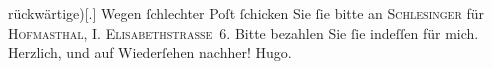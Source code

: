 \begin{ledgroupsized}[t]{13cm}
                  rückwärtige){[}.{]} Wegen ſchlechter Poſt ſchicken Sie ſie bitte an
                  \textsc{Schlesinger} für \textsc{Hofma{\geminationn}sthal}, I. \textsc{Elisabethstrasse 6}.
               Bitte bezahlen Sie ſie indeſſen für mich. Herzlich, und auf Wiederſehen nachher!\pend
           \pstart \spacefill\mbox{Hugo.}\pend{}\endnumbering{}\end{ledgroupsized}  \newcommand{\dateiname}{L01557}\newcommand{\titel}{Hugo von Hofmannsthal an Arthur Schnitzler, 6. 10. 1905}\newcommand{\editorInnen}{Martin Anton Müller und Gerd-Hermann Susen}
            \footnotesize
\begin{ledgroupsized}[t]{11.5cm}
\end{ledgroupsized}
         
      